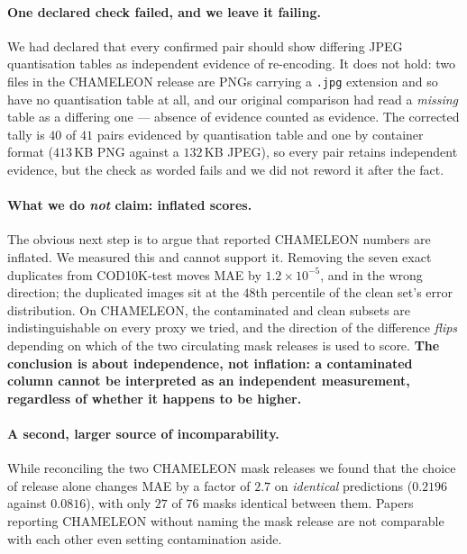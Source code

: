 \documentclass{article}
\begin{document}
\paragraph{One declared check failed, and we leave it failing.}
We had declared that every confirmed pair should show differing JPEG
quantisation tables as independent evidence of re-encoding. It does not hold:
two files in the CHAMELEON release are PNGs carrying a \texttt{.jpg} extension
and so have no quantisation table at all, and our original comparison had read a
\emph{missing} table as a differing one --- absence of evidence counted as
evidence. The corrected tally is $40$ of $41$ pairs evidenced by quantisation
table and one by container format ($413$\,KB PNG against a $132$\,KB JPEG), so
every pair retains independent evidence, but the check as worded fails and we
did not reword it after the fact.

\paragraph{What we do \emph{not} claim: inflated scores.}
The obvious next step is to argue that reported CHAMELEON numbers are inflated.
We measured this and cannot support it. Removing the seven exact duplicates from
COD10K-test moves MAE by $1.2 \times 10^{-5}$, and in the wrong direction; the
duplicated images sit at the $48$th percentile of the clean set's error
distribution. On CHAMELEON, the contaminated and clean subsets are
indistinguishable on every proxy we tried, and the direction of the difference
\emph{flips} depending on which of the two circulating mask releases is used to
score. \textbf{The conclusion is about independence, not inflation: a
contaminated column cannot be interpreted as an independent measurement,
regardless of whether it happens to be higher.}

\paragraph{A second, larger source of incomparability.}
While reconciling the two CHAMELEON mask releases we found that the choice of
release alone changes MAE by a factor of $2.7$ on \emph{identical} predictions
($0.2196$ against $0.0816$), with only $27$ of $76$ masks identical between them.
Papers reporting CHAMELEON without naming the mask release are not comparable
with each other even setting contamination aside.
\end{document}
